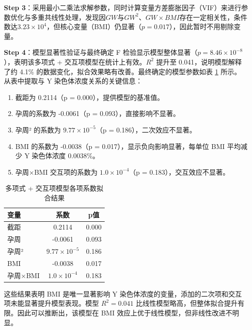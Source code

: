 \documentclass[withoutpreface,bwprint]{cumcmthesis} %
\begin{document}
\textbf{Step 3}：采用最小二乘法求解参数，同时计算变量方差膨胀因子（VIF）来进行参数优化与多重共线性处理，发现因$GW$与$GW^2$、$GW \times BMI$存在一定相关性，条件数达$3.23 \times 10^4$，但核心变量（BMI）仍显著（$p=0.017$），因此暂时不用剔除变量。

\textbf{Step 4}：模型显著性验证与最终确定
F 检验显示模型整体显著（$p=8.46 \times 10^{-8}$），表明该多项式 + 交互项模型在统计上有效。$R^2$ 提升至 0.041，说明模型解释了约 4.1\% 的数据变化，拟合效果略有改善。最终确定的模型参数如表 \ref{tab:多项式 + 交互项模型各项系数拟合结果} 所示。
从表中提取与 Y 染色体浓度关系的关键信息：
\begin{enumerate}
    \item 截距为 0.2114（p = 0.000），提供模型的基准值。
    \item 孕周的系数为 -0.0061（p = 0.093），直接影响不显著。
    \item 孕周² 的系数为 $9.77 \times 10^{-5}$（p = 0.186），二次效应不显著。
    \item BMI 的系数为 -0.0038（p = 0.017），显示负向影响显著，每单位 BMI 平均减少 Y 染色体浓度 0.0038\%。
    \item 孕周×BMI 交互项的系数为 $1.0 \times 10^{-4}$（p = 0.183），交互效应不显著。
\end{enumerate}

\begin{table}[H]
    \centering  %
    \caption{多项式 + 交互项模型各项系数拟合结果}  %
    \label{tab:多项式 + 交互项模型各项系数拟合结果}  %
    \begin{threeparttable}
        \begin{tabularx}{0.4\textwidth}{l c c }
            \toprule[1.5pt]
            \textbf{变量} & \textbf{系数} & \textbf{p值}\\ 
            \midrule[1pt]
            截距 & 0.2114 & 0.000  \\
            孕周 & -0.0061 & 0.093  \\
            孕周² & $9.77 \times 10^{-5}$ & 0.186  \\
            BMI & -0.0038 & 0.017  \\
            孕周×BMI & $1.0 \times 10^{-4}$ & 0.183  \\        \bottomrule[1.5pt]
    \end{tabularx}
\end{threeparttable}
\end{table} 

这些结果表明 BMI 是唯一显著影响 Y 染色体浓度的变量，添加的二次项和交互项未能显著提升模型表现。模型 $R^2 = 0.041$ 比线性模型略高，但整体拟合提升有限。因此可以推断出，该模型在 BMI 效应上优于线性模型，但非线性改进不明显。
\end{document}
